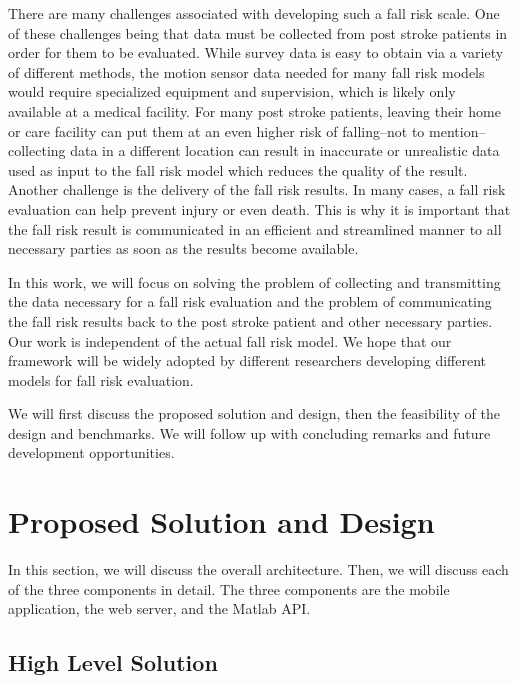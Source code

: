 \documentclass[conference]{IEEEtran}
\begin{document}
There are many challenges associated with developing such a fall risk scale. One of these challenges being that data must be collected from post stroke patients in order for them to be evaluated. While survey data is easy to obtain via a variety of different methods, the motion sensor data needed for many fall risk models would require specialized equipment and supervision, which is likely only available at a medical facility. For many post stroke patients, leaving their home or care facility can put them at an even higher risk of falling--not to mention--collecting data in a different location can result in inaccurate or unrealistic data used as input to the fall risk model which reduces the quality of the result. Another challenge is the delivery of the fall risk results. In many cases, a fall risk evaluation can help prevent injury or even death. This is why it is important that the fall risk result is communicated in an efficient and streamlined manner to all necessary parties as soon as the results become available.

In this work, we will focus on solving the problem of collecting and transmitting the data necessary for a fall risk evaluation and the problem of communicating the fall risk results back to the post stroke patient and other necessary parties. Our work is independent of the actual fall risk model. We hope that our framework will be widely adopted by different researchers developing different models for fall risk evaluation. 

We will first discuss the proposed solution and design, then the feasibility of the design and benchmarks. We will follow up with concluding remarks and future development opportunities. 

\section{Proposed Solution and Design}

In this section, we will discuss the overall architecture. Then, we will discuss each of the three components in detail. The three components are the mobile application, the web server, and the Matlab API. 

\subsection{High Level Solution}
\end{document}
